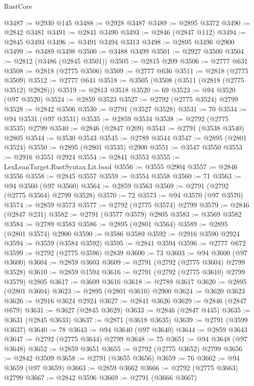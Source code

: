 \begin{lexlean}{RustCore}
\begin{coremodule}
@3487 := @2930 @145
@3488 := @2928 @3487
@3489 := @2895 @3372
@3490 := @2842 @3481
@3491 := @2841 @3490
@3493 := @2846 (@2847 @112)
@3494 := @2845 @3493
@3496 := @3491 @3494 @3313
@3498 := @2895 @3496 @2900
@3499 := @3489 @3498
@3500 := @3488 @3499
@3501 := @2927 @3500
@3504 := @2812 (@3486 (@2845 @3501))
@3505 := @2815 @209
@3506 := @2777 @631
@3508 := @2818 (@2775 @3506)
@3509 := @2777 @636
@3511 := @2818 (@2775 @3509)
@3512 := @2777 @641
@3518 := @3505 (@3508 (@3511 (@2818 (@2775 @3512) @2828)))
@3519 := @2813 @3518
@3520 := 69
@3523 := @94 @3520 (@97 @3520)
@3524 := @2859 @3523
@3527 := @2792 (@2775 @3524) @2799
@3528 := @2842 @3506
@3530 := @2791 (@3527 @3528)
@3531 := 70
@3534 := @94 @3531 (@97 @3531)
@3535 := @2859 @3534
@3538 := @2792 (@2775 @3535) @2799
@3540 := @2846 (@2847 @209)
@3543 := @2791 (@3538 @3540) @2805
@3544 := @3530 @3543
@3545 := @2789 @3544
@3547 := @2895 (@2801 @3524)
@3550 := @2895 (@2801 @3535) @2900
@3551 := @3547 @3550
@3553 := @2916 @3551 @2924
@3554 := @2841 @3553
@3555 := LexLeanTarget.RustSyntax.Lit.bool
@3556 := @3555 @2904
@3557 := @2846 @3556
@3558 := @2845 @3557
@3559 := @3554 @3558
@3560 := 71
@3563 := @94 @3560 (@97 @3560)
@3564 := @2859 @3563
@3569 := @2791 (@2792 (@2775 @3564) @2799 @3528)
@3570 := 72
@3573 := @94 @3570 (@97 @3570)
@3574 := @2859 @3573
@3577 := @2792 (@2775 @3574) @2799
@3579 := @2846 (@2847 @231)
@3582 := @2791 (@3577 @3579) @2805
@3583 := @3569 @3582
@3584 := @2789 @3583
@3586 := @2895 (@2801 @3564)
@3589 := @2895 (@2801 @3574) @2900
@3590 := @3586 @3589
@3592 := @2916 @3590 @2924
@3594 := @3559 (@3584 @3592)
@3595 := @2841 @3594
@3596 := @2777 @672
@3599 := @2792 (@2775 @3596) @2839
@3600 := 73
@3603 := @94 @3600 (@97 @3600)
@3604 := @2859 @3603
@3609 := @2791 (@2792 (@2775 @3604) @2799 @3528)
@3610 := @2859 @1594
@3616 := @2791 (@2792 (@2775 @3610) @2799 @3579) @2805
@3617 := @3609 @3616
@3618 := @2789 @3617
@3620 := @2895 (@2801 @3604)
@3623 := @2895 (@2801 @3610) @2900
@3624 := @3620 @3623
@3626 := @2916 @3624 @2924
@3627 := @2841 @3626
@3629 := @2846 (@2847 @679)
@3631 := @3627 (@2845 @3629)
@3633 := @2846 (@2847 @445)
@3635 := @3631 (@2845 @3633)
@3637 := @2871 (@3618 @3635)
@3639 := @2791 (@3599 @3637)
@3640 := 78
@3643 := @94 @3640 (@97 @3640)
@3644 := @2859 @3643
@3647 := @2792 (@2775 @3644) @2799
@3648 := 75
@3651 := @94 @3648 (@97 @3648)
@3652 := @2859 @3651
@3655 := @2792 (@2775 @3652) @2799
@3656 := @2842 @3509
@3658 := @2791 (@3655 @3656)
@3659 := 76
@3662 := @94 @3659 (@97 @3659)
@3663 := @2859 @3662
@3666 := @2792 (@2775 @3663) @2799
@3667 := @2842 @3596
@3669 := @2791 (@3666 @3667)

\end{coremodule}
\end{lexlean}
